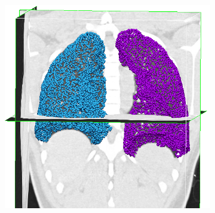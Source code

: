 {\begin{figure}[htbp] 
\centering
\begin{subfigure}{.43\linewidth}%
  \includegraphics[width=\linewidth,trim={{.0\wd0} {.0\wd0} {.0\wd0} {.0\wd0}},clip]{Segmentation/Image/LungDigitising.png} %

\end{subfigure}
\end{figure}}
